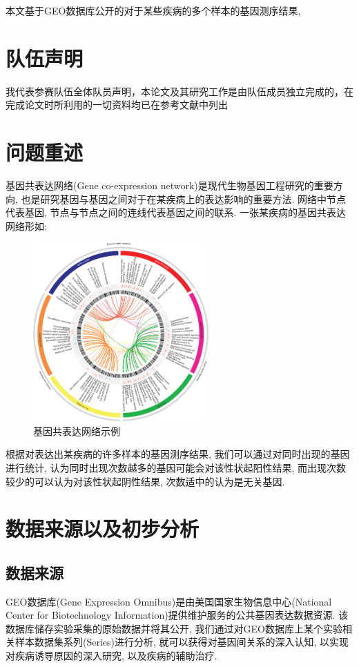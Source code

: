 \documentclass[zihao=-4]{ctexart}
\begin{document}
本文基于GEO数据库公开的对于某些疾病的多个样本的基因测序结果, 


\newpage

\section*{队伍声明}

我代表参赛队伍全体队员声明，本论文及其研究工作是由队伍成员独立完成的，在完成论文时所利用的一切资料均已在参考文献中列出 
\newpage
\tableofcontents

\section{问题重述}
基因共表达网络(Gene co-expression network)是现代生物基因工程研究的重要方向, 也是研究基因与基因之间对于在某疾病上的表达影响的重要方法. 网络中节点代表基因, 节点与节点之间的连线代表基因之间的联系. 一张某疾病的基因共表达网络形如:
\begin{figure}[H]
    \centering
    \includegraphics[width=0.6\textwidth]{pic/example.jpg}
    \caption{基因共表达网络示例\cite{example}}
\end{figure}

根据对表达出某疾病的许多样本的基因测序结果, 我们可以通过对同时出现的基因进行统计, 认为同时出现次数越多的基因可能会对该性状起阳性结果, 而出现次数较少的可以认为对该性状起阴性结果, 次数适中的认为是无关基因.


\section{数据来源以及初步分析}
\subsection{数据来源}
GEO数据库(Gene Expression Omnibus)是由美国国家生物信息中心(National Center for Biotechnology Information)提供维护服务的公共基因表达数据资源. 该数据库储存实验采集的原始数据并将其公开, 我们通过对GEO数据库上某个实验相关样本数据集系列(Series)进行分析, 就可以获得对基因间关系的深入认知, 以实现对疾病诱导原因的深入研究, 以及疾病的辅助治疗.
\end{document}
